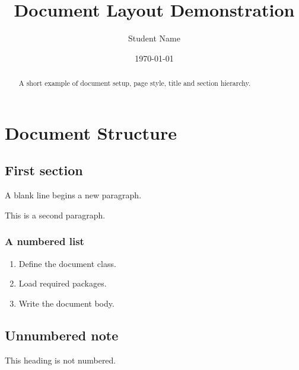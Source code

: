 \documentclass[11pt,a4paper]{report}
\title{Document Layout Demonstration}
\author{Student Name}
\date{\today}
\begin{document}
\maketitle
\begin{abstract}
A short example of document setup, page style, title and section hierarchy.
\end{abstract}
\chapter{Document Structure}
\section{First section}
A blank line begins a new paragraph.

This is a second paragraph.
\subsection{A numbered list}
\begin{enumerate}[itemsep=2pt]
  \item Define the document class.
  \item Load required packages.
  \item Write the document body.
\end{enumerate}
\section*{Unnumbered note}
This heading is not numbered.
\end{document}
